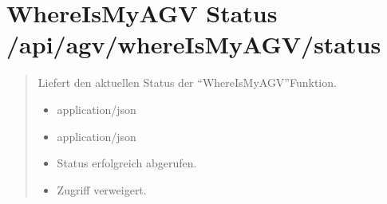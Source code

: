 \documentclass[letterpaper,10pt,english]{sphinxmanual}
\begin{document}
\section{WhereIsMyAGV Status \textendash{} /api/agv/whereIsMyAGV/status}
\label{\detokenize{agv_rest_api_wima:whereismyagv-status-api-agv-whereismyagv-status}}\label{\detokenize{agv_rest_api_wima:get-api-agv-wima-status}}

\begin{fulllineitems}
\label{\detokenize{agv_rest_api_wima:get--api-agv-whereIsMyAGV-status}}
\pysigstartsignatures
\pysigline
{}
\pysigstopsignatures\begin{quote}\begin{description}
\sphinxAtStartPar
Liefert den aktuellen Status der “WhereIsMyAGV”\sphinxhyphen{}Funktion.

\begin{itemize}
\item {} 
\sphinxAtStartPar
{} \textendash{} application/json

\end{itemize}

\begin{itemize}
\item {} 
\sphinxAtStartPar
{} \textendash{} application/json

\end{itemize}

\begin{itemize}
\item {} 
\sphinxAtStartPar
{} \textendash{} Status erfolgreich abgerufen.

\item {} 
\sphinxAtStartPar
{} \textendash{} Zugriff verweigert.

\end{itemize}

\end{description}\end{quote}

\end{fulllineitems}
\end{document}

